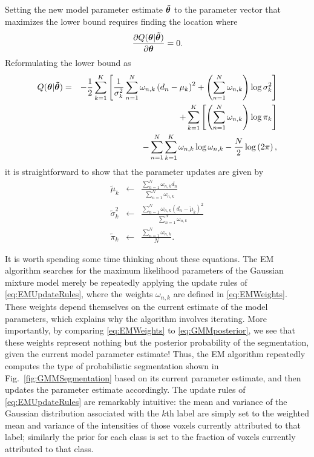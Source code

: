 \documentclass[10pt,twoside]{book}
\begin{document}
Setting the new model parameter estimate ${\mbox{\boldmath {${\tilde{\theta}}$}}}$ to the parameter vector that maximizes the lower bound requires finding the location where
\begin{displaymath}
  \frac{\partial Q( {\mbox{\boldmath {${\theta}$}}} | {\mbox{\boldmath {${\tilde{\theta}}$}}} )}{ \partial {\mbox{\boldmath {${\theta}$}}}} = 0.
\end{displaymath}
Reformulating the lower bound as
\begin{eqnarray}
  Q( {\mbox{\boldmath {${\theta}$}}} | {\mbox{\boldmath {${\tilde{\theta}}$}}}) & = & -\frac{1}{2} \sum_{k=1}^K \left[ \frac{1}{\sigma_k^2}\sum_{n=1}^N \omega_{n,k} \left( d_n - \mu_k  \right)^2  
                                                                               + \left( \sum_{n=1}^N \omega_{n,k}  \right) \log \sigma_k^2 \right] 
                                                    \nonumber \\ 
                                              & &  + \sum_{k=1}^K \left[ \left( \sum_{n=1}^N \omega_{n,k} \right) \log \pi_k \right] \nonumber \\
                                              & &  - \sum_{n=1}^N\sum_{k=1}^K \omega_{n,k} \log \omega_{n,k} -\frac{N}{2}\log\left( 2 \pi \right),
  \label{eq:EMLowerBoundReformulated}
\end{eqnarray}
it is straightforward to show that the parameter updates 
are given by
\begin{eqnarray}
  \tilde{\mu}_k & \gets & \frac{\sum_{n=1}^N \omega_{n,k} d_n}{\sum_{n=1}^N \omega_{n,k}} \nonumber \\ 
  \tilde{\sigma}_k^2 & \gets & \frac{\sum_{n=1}^N \omega_{n,k} \left( d_n - \tilde{\mu}_k \right)^2 }{\sum_{n=1}^N \omega_{n,k}} \label{eq:EMUpdateRules}\\ 
  \tilde{\pi}_k & \gets & \frac{\sum_{n=1}^N \omega_{n,k} }{N}. \nonumber
\end{eqnarray}

It is worth spending some time thinking about these equations. The EM algorithm searches for the maximum likelihood parameters of the Gaussian mixture model merely be repeatedly applying the update rules of \eqref{eq:EMUpdateRules}, where the weights $\omega_{n,k}$ are defined in \eqref{eq:EMWeights}. These weights depend themselves on the current estimate of the model parameters, which explains why the algorithm involves iterating. More importantly, by comparing \eqref{eq:EMWeights} to \eqref{eq:GMMposterior}, we see that these weights represent nothing but the posterior probability of the segmentation, given the current model parameter estimate! Thus, the EM algorithm repeatedly computes the type of probabilistic segmentation shown in Fig.~\ref{fig:GMMSegmentation} based on its current parameter estimate, and then updates the parameter estimate accordingly. The update rules of \eqref{eq:EMUpdateRules} are remarkably intuitive: the mean and variance of the Gaussian distribution associated with the $k$th label are simply set to the weighted mean and variance of the intensities of those voxels currently attributed to that label; similarly the prior for each class is set to the fraction of voxels currently attributed to that class.
\end{document}
